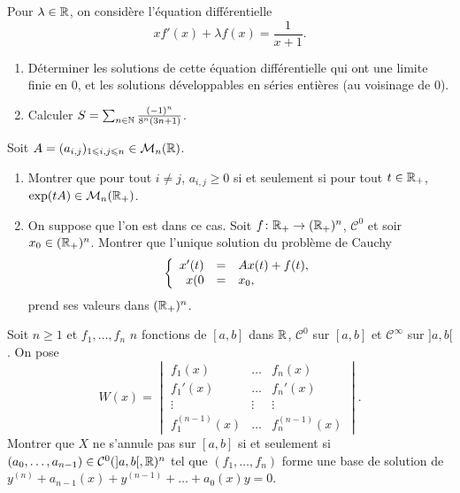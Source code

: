 \documentclass[12pt]{article}
\begin{document}
\begin{exercise}
	Pour $\lambda\in\mathbb{R}$, on considère l'équation différentielle 
	\begin{equation}
		xf'(x)+\lambda f(x)=\frac{1}{x+1}.
	\end{equation}
	\begin{enumerate}
		\item Déterminer les solutions de cette équation différentielle qui ont une limite finie en 0, et les solutions développables en séries entières (au voisinage de 0).
		\item Calculer $S=\sum_{n\in\mathbb{N}}\frac{(-1)^{n}}{8^{n}(3n+1)}$.
	\end{enumerate}
\end{exercise}

\begin{exercise}
	Soit $A=(a_{i,j})_{1\leqslant i,j\leqslant n}\in\mathcal{M}_n(\mathbb{R})$.
	\begin{enumerate}
		\item Montrer que pour tout $i\neq j$, $a_{i,j}\geqslant0$ si et seulement si pour tout $t\in\mathbb{R}_{+}$, $\exp(tA)\in\mathcal{M}_n(\mathbb{R}_{+})$.
		\item On suppose que l'on est dans ce cas. Soit $f\colon\mathbb{R}_{+}\to(\mathbb{R}_{+})^{n}$, $\mathcal{C}^{0}$ et soir $x_{0}\in(\mathbb{R}_{+})^{n}$. Montrer que l'unique solution du problème de Cauchy 
		\begin{equation}
			\left\lbrace
				\begin{array}[]{rcl}
					x'(t)&=&Ax(t)+f(t),\\
					x(0&=&x_0,
				\end{array}
			\right.
		\end{equation}
		prend ses valeurs dans $(\mathbb{R}_{+})^{n}$.
	\end{enumerate}
\end{exercise}

\begin{exercise}
	Soit $n\geqslant1$ et $f_1,\dots,f_n$ $n$ fonctions de $[a,b]$ dans $\mathbb{R}$, $\mathcal{C}^{0}$ sur $[a,b]$ et $\mathcal{C}^{\infty}$ sur $]a,b[$. On pose 
	\begin{equation}
		W(x)=
		\begin{vmatrix}
			f_1(x) &\dots &f_n(x)\\
			f_1'(x) &\dots &f_n'(x)\\
			\vdots&\vdots&\vdots\\
			f_1^{(n-1)}(x) &\dots &f_n^{(n-1)}(x)
		\end{vmatrix}.
	\end{equation}
	Montrer que $X$ ne s'annule pas sur $[a,b]$ si et seulement si $(a_0,\dots,a_{n-1})\in\mathcal{C}^{0}(]a,b[,\mathbb{R})^{n}$ tel que $(f_1,\dots,f_n)$ forme une base de solution de $y^{(n)}+a_{n-1}(x)+y^{(n-1)}+\dots+a_0(x)y=0$.
\end{exercise}
\end{document}
